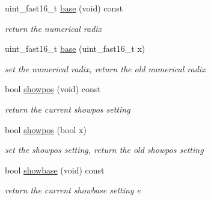 \begin{DoxyCompactItemize}
\mbox{\label{classhwlib_1_1ostream_a12824525554fe5202a7a9fd3d75f4be6}} 
uint\+\_\+fast16\+\_\+t \hyperlink{classhwlib_1_1ostream_a12824525554fe5202a7a9fd3d75f4be6}{base} (void) const
\begin{DoxyCompactList}\small\item\em return the numerical radix \end{DoxyCompactList}\item 
\mbox{\label{classhwlib_1_1ostream_a8634372140dfd41809f435917bafd99a}} 
uint\+\_\+fast16\+\_\+t \hyperlink{classhwlib_1_1ostream_a8634372140dfd41809f435917bafd99a}{base} (uint\+\_\+fast16\+\_\+t x)
\begin{DoxyCompactList}\small\item\em set the numerical radix, return the old numerical radix \end{DoxyCompactList}\item 
\mbox{\label{classhwlib_1_1ostream_a204465ae739f62eed0f1a27c389e85f2}} 
bool \hyperlink{classhwlib_1_1ostream_a204465ae739f62eed0f1a27c389e85f2}{showpos} (void) const
\begin{DoxyCompactList}\small\item\em return the current showpos setting \end{DoxyCompactList}\item 
\mbox{\label{classhwlib_1_1ostream_ab0931ccb8c1a13f00eb9b023bf0a2ed9}} 
bool \hyperlink{classhwlib_1_1ostream_ab0931ccb8c1a13f00eb9b023bf0a2ed9}{showpos} (bool x)
\begin{DoxyCompactList}\small\item\em set the showpos setting, return the old showpos setting \end{DoxyCompactList}\item 
\mbox{\label{classhwlib_1_1ostream_af415806494e565a2dafc77d41c3ce24e}} 
bool \hyperlink{classhwlib_1_1ostream_af415806494e565a2dafc77d41c3ce24e}{showbase} (void) const
\begin{DoxyCompactList}\small\item\em return the current showbase setting e \end{DoxyCompactList}\item 
\mbox{\label{classhwlib_1_1ostream_af3c605a903254360ef4d1780c6879f9d}} 

\end{DoxyCompactItemize}
